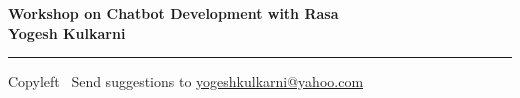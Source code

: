 
\graphicspath{{images/}}

\footnotesize


\begin{center}
\Large{\textbf{Workshop on Chatbot Development with Rasa\\ Yogesh Kulkarni}}  
\end{center}

\begin{multicols}{2}

\end{multicols}

\rule{\linewidth}{0.25pt}
\scriptsize
Copyleft \textcopyleft\  Send suggestions to 
\href{http://www.yogeshkulkarni.com}{yogeshkulkarni@yahoo.com}


